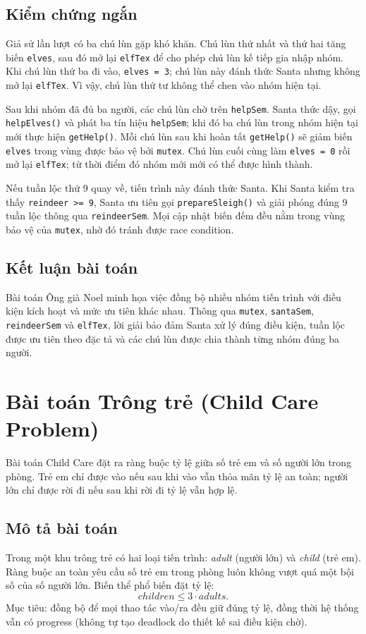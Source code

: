 \subsection{Kiểm chứng ngắn}

Giả sử lần lượt có ba chú lùn gặp khó khăn. Chú lùn thứ nhất và thứ hai
tăng biến \texttt{elves}, sau đó mở lại \texttt{elfTex} để cho phép chú
lùn kế tiếp gia nhập nhóm. Khi chú lùn thứ ba đi vào,
\texttt{elves = 3}; chú lùn này đánh thức Santa nhưng không mở lại
\texttt{elfTex}. Vì vậy, chú lùn thứ tư không thể chen vào nhóm hiện tại.

Sau khi nhóm đã đủ ba người, các chú lùn chờ trên \texttt{helpSem}.
Santa thức dậy, gọi \texttt{helpElves()} và phát ba tín hiệu
\texttt{helpSem}; khi đó ba chú lùn trong nhóm hiện tại mới thực hiện
\texttt{getHelp()}. Mỗi chú lùn sau khi hoàn tất \texttt{getHelp()} sẽ
giảm biến \texttt{elves} trong vùng được bảo vệ bởi \texttt{mutex}. Chú lùn cuối cùng làm
\texttt{elves = 0} rồi mở lại \texttt{elfTex}; từ thời điểm đó nhóm mới
mới có thể được hình thành.

Nếu tuần lộc thứ 9 quay về, tiến trình này đánh thức Santa. Khi Santa
kiểm tra thấy \texttt{reindeer >= 9}, Santa ưu tiên gọi
\texttt{prepareSleigh()} và giải phóng đúng 9 tuần lộc thông qua
\texttt{reindeerSem}. Mọi cập nhật biến đếm đều nằm trong vùng bảo vệ
của \texttt{mutex}, nhờ đó tránh được race condition.

\subsection{Kết luận bài toán}

Bài toán Ông già Noel minh họa việc đồng bộ nhiều nhóm tiến trình với
điều kiện kích hoạt và mức ưu tiên khác nhau. Thông qua
\texttt{mutex}, \texttt{santaSem}, \texttt{reindeerSem} và
\texttt{elfTex}, lời giải bảo đảm Santa xử lý đúng điều kiện, tuần lộc
được ưu tiên theo đặc tả và các chú lùn được chia thành từng nhóm đúng
ba người.

\section{Bài toán Trông trẻ (Child Care Problem)}

Bài toán Child Care đặt ra ràng buộc tỷ lệ giữa số trẻ em và số người lớn trong phòng. Trẻ em chỉ được vào nếu sau khi vào vẫn thỏa mãn tỷ lệ an toàn; người lớn chỉ được rời đi nếu sau khi rời đi tỷ lệ vẫn hợp lệ.

\subsection{Mô tả bài toán}
Trong một khu trông trẻ có hai loại tiến trình: \textit{adult} (người lớn) và \textit{child} (trẻ em). Ràng buộc an toàn yêu cầu số trẻ em trong phòng luôn không vượt quá một bội số của số người lớn. Biến thể phổ biến đặt tỷ lệ:
\[
    children \le 3 \cdot adults.
\]
Mục tiêu: đồng bộ để mọi thao tác vào/ra đều giữ đúng tỷ lệ, đồng thời hệ thống vẫn có progress (không tự tạo deadlock do thiết kế sai điều kiện chờ).

